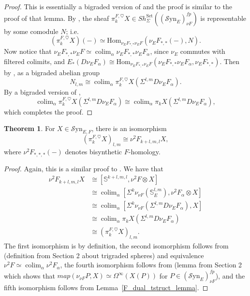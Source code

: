 \documentclass[10pt]{amsart}
\theoremstyle{definition}
\numberwithin{figure}{section}
\numberwithin{equation}{section}
\newtheorem{theorem}[figure]{Theorem}
\theoremstyle{cited}
\newcommand{\bS}{\mathbb{S}}
\newcommand{\colim}{\operatorname{colim}}
\newcommand{\Hom}{\mathrm{Hom}}
\newcommand{\Syn}{\mathcal{S}\mathrm{yn}}
\begin{document}
\begin{proof}
    This is essentially a bigraded version of \cite[Lemma 4.17]{Pst22} and the proof is similar to the proof of that lemma. By \cite[Thm. 2.58]{Pst22}, the sheaf $\pi_k^{F,\heartsuit}X\in Sh_{\Sigma}^{\mathrm{Set}}((\Syn_E)_{\nu F}^{fp})$ is representable by some comodule $N$; i.e. $$(\pi_k^{F,\heartsuit}X)(-)\simeq \Hom_{\nu_EF_{*,*}\nu_EF}(\nu_EF_{*,*}(-),N).$$
    Now notice that $\nu_EF_{*,*}\nu_EF\simeq \colim_\alpha \nu_EF_{*,*}\nu_EF_\alpha$, since $\nu_E$ commutes with filtered colimits, and $E_*(D\nu_EF_\alpha)\cong\Hom_{\nu_EF_{*,*}\nu_EF}(\nu_EF_{*,*}\nu_EF_\alpha,\nu_EF_{*,*})$. Then by \cite[Lemma 3.3]{Pst22}, as a bigraded abelian group
    $$
N_{l,m}\cong \colim_\alpha \pi_k^{F,\heartsuit}X(\Sigma^{l,m}D\nu_EF_\alpha).
    $$
    By a bigraded version of \cite[Lemma 3.25]{Pst22},
    $$
\colim_{\alpha}\pi_k^{F,\heartsuit}X(\Sigma^{l,m}D\nu_EF_\alpha)\cong\colim_{\alpha} \pi_kX(\Sigma^{l,m}D\nu_EF_\alpha),
    $$
    which completes the proof.
\end{proof}

\begin{theorem}
\label{F_homol_tstruct_theorem}
    For $X\in\Syn_{E,F}$, there is an isomorphism
    $$
(\pi_k^{F,\heartsuit}X)_{l,m}\cong\nu^2F_{k+l,m,l}X,
    $$
    where $\nu^2F_{*,*,*}(-)$ denotes bisynthetic $F$-homology.
\end{theorem}

\begin{proof}
    Again, this is a similar proof to \cite[Thm. 4.18]{Pst22}. We have that
    \begin{equation*}
     \begin{aligned}
      \nu^2F_{k+l,m,l}X&\cong [\bS^{k+l,m,l},\nu^2F\otimes X] \\
      &\cong \colim_\alpha[\Sigma^k\nu_{\nu F}(\bS^{l,m}_E),\nu^2F_\alpha\otimes X] \\
      &\cong \colim_\alpha [\Sigma^k\nu_{\nu F}(\Sigma^{l,m}D\nu_EF_\alpha),X] \\
      &\cong \colim_\alpha \pi_kX(\Sigma^{l,m}D\nu_EF_\alpha) \\
      &\cong (\pi_k^{F,\heartsuit}X)_{l,m}.
    \end{aligned}   
    \end{equation*}
 The first isomorphism is by definition, the second isomorphism follows from (definition from Section 2 about trigraded spheres) and equivalence $\nu^2F\simeq\colim_\alpha \nu^2F_\alpha$, the fourth isomorphism follows from (lemma from Section 2 which shows that $map(\nu_{\nu F}P,X)\simeq \Omega^\infty(X(P))$ for $P\in(\Syn_E)_{\nu F}^{fp}$), and the fifth isomorphism follows from Lemma~\ref{F_dual_tstruct_lemma}.   
\end{proof}
\end{document}
